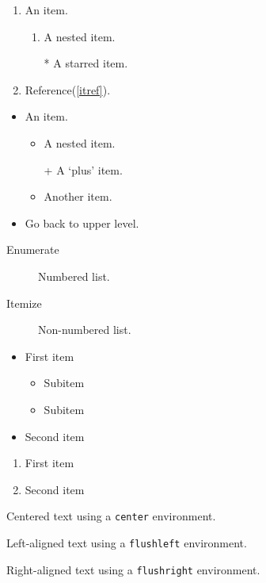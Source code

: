 \documentclass{ctexbook}
\begin{document}
\begin{enumerate}
    \item An item.
    \begin{enumerate}
        \item A nested item.\label{itref}
        \item[*] A starred item.
    \end{enumerate}
    \item Reference(\ref{itref}).
\end{enumerate}

\begin{itemize}
    \item An item.
    \begin{itemize}
        \item A nested item.
        \item[+] A `plus' item.
        \item Another item.
    \end{itemize}
    \item Go back to upper level.
\end{itemize}

\begin{description}
    \item[Enumerate] Numbered list.
    \item[Itemize] Non-numbered list. 
\end{description}

\renewcommand{\labelitemi}{\ddag}
\renewcommand{\labelitemii}{\dag}
\begin{itemize}
    \item First item
    \begin{itemize}
        \item Subitem
        \item Subitem
    \end{itemize}
    \item Second item
\end{itemize}

\renewcommand{\labelenumi}{\Alph{enumi}>}
\begin{enumerate}
    \item First item
    \item Second item
\end{enumerate}

\begin{center}
    Centered text using a \verb|center| environment.
\end{center}
\begin{flushleft}
    Left-aligned text using a \verb|flushleft| environment.
\end{flushleft}
\begin{flushright}
    Right-aligned text using a \verb|flushright| environment.
\end{flushright}
\end{document}
